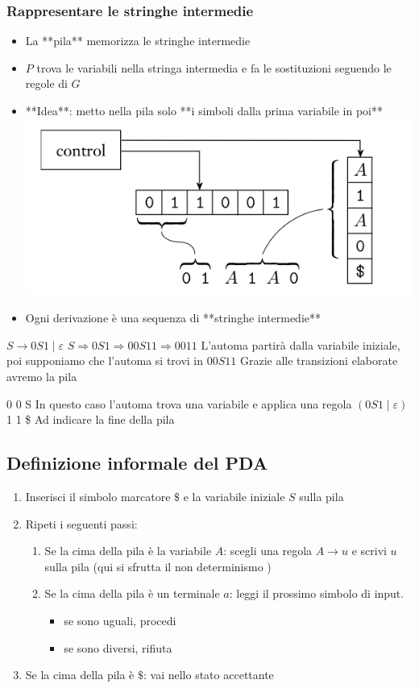 \subsubsection{Rappresentare le stringhe intermedie}
\begin{itemize}
	\item La **pila** memorizza le stringhe intermedie
	\item $P$ trova le variabili nella stringa intermedia e fa le sostituzioni
  	seguendo le regole di $G$ 
	\item **Idea**: metto nella pila solo **i simboli dalla prima variabile in poi**
		\includegraphics[scale=0.5]{img/stringhe_intermedie.png}
	\item Ogni derivazione è una sequenza di **stringhe intermedie**
\end{itemize}

$S\rightarrow 0S1\mid\varepsilon$ 
$S\Rightarrow 0S1\Rightarrow 00S11\Rightarrow 0011$
L'automa partirà dalla variabile iniziale, poi supponiamo che l'automa si trovi in $00S11$ 
Grazie alle transizioni elaborate avremo la pila 

0
0
S  In questo caso l'automa trova una variabile e applica una regola $(0S1\mid\varepsilon)$
1
1
\$  Ad indicare la fine della pila 

\subsection{Definizione informale del PDA}
\begin{enumerate}
	\item Inserisci il simbolo marcatore $\$$ e la variabile iniziale $S$  sulla pila
	\item  Ripeti i seguenti passi:
		\begin{enumerate}
			\item Se la cima della pila è la variabile $A$: scegli una regola $A\rightarrow u$ e 
				scrivi $u$ sulla pila (qui si sfrutta il non determinismo )
			\item Se la cima della pila è un terminale $a$: leggi il prossimo simbolo
				di input.
				\begin{itemize}
					\item se sono uguali, procedi
					\item se sono diversi, rifiuta
				\end{itemize}
		\end{enumerate}
	\item Se la cima della pila è $\$$: vai nello stato accettante
\end{enumerate}

